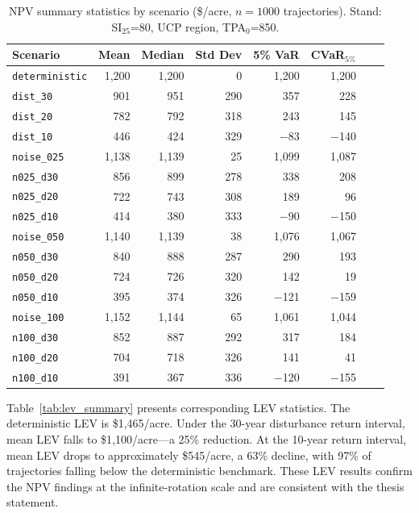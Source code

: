 \documentclass[12pt]{report}
\begin{document}
\begin{table}[htbp]
  \centering
  \caption{NPV summary statistics by scenario (\$/acre, $n=1000$ trajectories). Stand: SI$_{25}$=80, UCP region, TPA$_0$=850.}
  \label{tab:npv_summary}
  \small
  \begin{tabular}{lrrrrrrr}
  \toprule
  Scenario & Mean & Median & Std Dev & 5\% VaR & CVaR$_{5\%}$ \\
  \midrule
  \texttt{deterministic} & 1{,}200 & 1{,}200 & 0 & 1{,}200 & 1{,}200 \\
  \texttt{dist\_30}      & 901  & 951  & 290 & 357  & 228 \\
  \texttt{dist\_20}      & 782  & 792  & 318 & 243  & 145 \\
  \texttt{dist\_10}      & 446  & 424  & 329 & $-$83  & $-$140 \\
  \texttt{noise\_025}    & 1{,}138 & 1{,}139 & 25  & 1{,}099 & 1{,}087 \\
  \texttt{n025\_d30}     & 856  & 899  & 278 & 338  & 208 \\
  \texttt{n025\_d20}     & 722  & 743  & 308 & 189  & 96 \\
  \texttt{n025\_d10}     & 414  & 380  & 333 & $-$90  & $-$150 \\
  \texttt{noise\_050}    & 1{,}140 & 1{,}139 & 38  & 1{,}076 & 1{,}067 \\
  \texttt{n050\_d30}     & 840  & 888  & 287 & 290  & 193 \\
  \texttt{n050\_d20}     & 724  & 726  & 320 & 142  & 19 \\
  \texttt{n050\_d10}     & 395  & 374  & 326 & $-$121 & $-$159 \\
  \texttt{noise\_100}    & 1{,}152 & 1{,}144 & 65  & 1{,}061 & 1{,}044 \\
  \texttt{n100\_d30}     & 852  & 887  & 292 & 317  & 184 \\
  \texttt{n100\_d20}     & 704  & 718  & 326 & 141  & 41 \\
  \texttt{n100\_d10}     & 391  & 367  & 336 & $-$120 & $-$155 \\
  \bottomrule
  \end{tabular}
\end{table}

Table~\ref{tab:lev_summary} presents corresponding LEV statistics. The deterministic LEV is \$1{,}465/acre. Under the 30-year disturbance return interval, mean LEV falls to \$1{,}100/acre---a 25\% reduction. At the 10-year return interval, mean LEV drops to approximately \$545/acre, a 63\% decline, with 97\% of trajectories falling below the deterministic benchmark. These LEV results confirm the NPV findings at the infinite-rotation scale and are consistent with the thesis statement.
\end{document}
